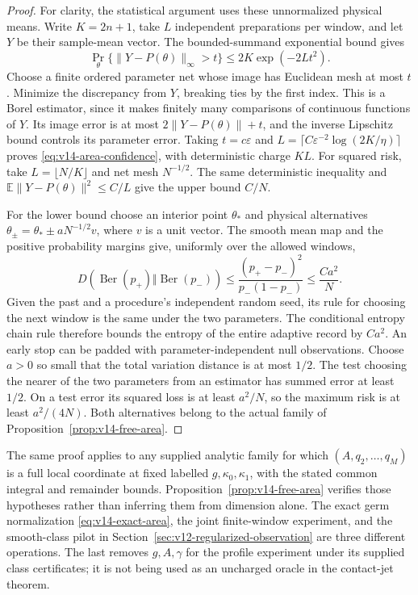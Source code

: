\begin{proof}
For clarity, the statistical argument uses these unnormalized physical
means. Write $K=2n+1$, take $L$ independent preparations per window,
and let $Y$ be their sample-mean vector. The bounded-summand exponential
bound gives
\[
 \Pr_\theta\{\|Y-P(\theta)\|_\infty>t\}
                                      \le2K\exp(-2Lt^2).
\]
Choose a finite ordered parameter net whose image has Euclidean mesh
at most $t$. Minimize the discrepancy from $Y$, breaking ties by the
first index. This is a Borel estimator, since it makes finitely many
comparisons of continuous functions of $Y$. Its image error is at most
$2\|Y-P(\theta)\|+t$, and the inverse Lipschitz bound controls its
parameter error. Taking $t=c\varepsilon$ and
$L=\lceil C\varepsilon^{-2}\log(2K/\eta)\rceil$ proves
\eqref{eq:v14-area-confidence}, with deterministic charge $KL$.
For squared risk, take $L=\lfloor N/K\rfloor$ and net mesh
$N^{-1/2}$. The same deterministic inequality and
$\mathbb E\|Y-P(\theta)\|^2\le C/L$ give the upper bound $C/N$.

For the lower bound choose an interior point $\theta_*$ and physical
alternatives $\theta_\pm=\theta_*\pm aN^{-1/2}v$, where $v$ is a
unit vector. The smooth mean map and the positive probability margins
give, uniformly over the allowed windows,
\[
 D(\operatorname{Ber}(p_+)\Vert\operatorname{Ber}(p_-))
 \le\frac{(p_+-p_-)^2}{p_-(1-p_-)}\le\frac{Ca^2}{N}.
\]
Given the past and a procedure's independent random seed, its rule for
choosing the next window is the same under the two parameters. The
conditional entropy chain rule therefore bounds the entropy of the
entire adaptive record by $Ca^2$. An early stop can be padded with
parameter-independent null observations. Choose $a>0$ so small that
the total variation distance is at most $1/2$. The test choosing the
nearer of the two parameters from an estimator has summed error at
least $1/2$. On a test error its squared loss is at least $a^2/N$,
so the maximum risk is at least $a^2/(4N)$. Both alternatives belong
to the actual family of Proposition~\ref{prop:v14-free-area}.
\end{proof}

The same proof applies to any supplied analytic family for which
$(A,q_2,\ldots,q_M)$ is a full local coordinate at fixed labelled
$g,\kappa_0,\kappa_1$, with the stated common integral and remainder
bounds. Proposition~\ref{prop:v14-free-area} verifies those hypotheses
rather than inferring them from dimension alone. The exact germ
normalization \eqref{eq:v14-exact-area}, the joint finite-window
experiment, and the smooth-class pilot in
Section~\ref{sec:v12-regularized-observation} are three different operations.
The last removes $g,A,\gamma$ for the profile experiment under its
supplied class certificates; it is not being used as an uncharged
oracle in the contact-jet theorem.

